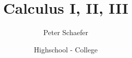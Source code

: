 

  
\title{Calculus I, II, III}
\author{Peter Schaefer}
\date{Highschool - College}



\maketitle
\tableofcontents
\newpage









